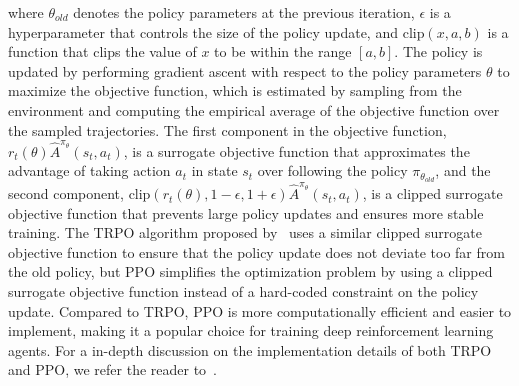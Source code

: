 where $\theta_{old}$ denotes the policy parameters at the previous iteration, $\epsilon$ is a hyperparameter that controls the size of the policy update, and $\text{clip}(x, a, b)$ is a function that clips the value of $x$ to be within the range $[a, b]$.
The policy is updated by performing gradient ascent with respect to the policy parameters $\theta$ to maximize the objective function, which is estimated by sampling from the environment and computing the empirical average of the objective function over the sampled trajectories.
The first component in the objective function, $r_t(\theta) \hat{A}^{\pi_{\theta}}(s_t, a_t)$, is a surrogate objective function that approximates the advantage of taking action $a_t$ in state $s_t$ over following the policy $\pi_{\theta_{old}}$, and the second component, $\text{clip}(r_t(\theta), 1-\epsilon, 1 + \epsilon) \hat{A}^{\pi_{\theta}}(s_t, a_t)$, is a clipped surrogate objective function that prevents large policy updates and ensures more stable training.
The TRPO algorithm proposed by~\cite{schulman2015trust} uses a similar clipped surrogate objective function to ensure that the policy update does not deviate too far from the old policy, but PPO simplifies the optimization problem by using a clipped surrogate objective function instead of a hard-coded constraint on the policy update.
Compared to TRPO, PPO is more computationally efficient and easier to implement, making it a popular choice for training deep reinforcement learning agents.
For a in-depth discussion on the implementation details of both TRPO and PPO, we refer the reader to~\cite{engstrom2020implementation}.

